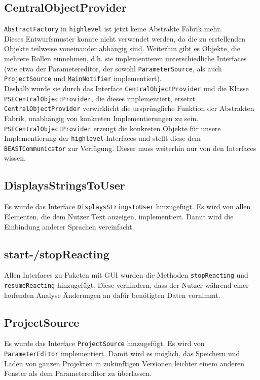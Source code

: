 \documentclass[a4paper]{scrreprt}
\begin{document}
\subsection{CentralObjectProvider}
\verb!AbstractFactory! in \verb!highlevel! ist jetzt keine Abstrakte Fabrik mehr.\\ Dieses Entwurfsmuster konnte nicht verwendet werden, da die zu erstellenden Objekte teilweise voneinander abhängig sind. Weiterhin gibt es Objekte, die mehrere Rollen einnehmen, d.h. sie implementieren unterschiedliche Interfaces (wie etwa der Parametereditor, der sowohl \verb!ParameterSource!, als auch \verb!ProjectSource! und \verb!MainNotifier! implementiert). \\
Deshalb wurde sie durch das Interface \verb!CentralObjectProvider! und die Klasse\\ \verb!PSECentralObjectProvider!, die dieses implementiert, ersetzt. \verb!CentralObjectProvider! verwirklicht die ursprüngliche Funktion der Abstrakten Fabrik, unabhängig von konkreten Implementierungen zu sein. \\
\verb!PSECentralObjectProvider! erzeugt die konkreten Objekte für unsere Implementierung der \verb!highlevel!-Interfaces und stellt diese dem \verb!BEASTCommunicator! zur Verfügung. Dieser muss weiterhin nur von den Interfaces wissen. \\

\subsection{DisplaysStringsToUser}
Es wurde das Interface \verb!DisplaysStringsToUser! hinzugefügt. Es wird von allen Elementen, die dem Nutzer Text anzeigen, implementiert. Damit wird die Einbindung anderer Sprachen vereinfacht. \\

\subsection{start-/stopReacting}
Allen Interfaces zu Paketen mit GUI wurden die Methoden \verb!stopReacting! und \\ \verb!resumeReacting! hinzugefügt. Diese verhindern, dass der Nutzer während einer laufenden Analyse Änderungen an dafür benötigten Daten vornimmt. \\

\subsection{ProjectSource}
Es wurde das Interface \verb!ProjectSource! hinzugefügt. Es wird von \verb!ParameterEditor! implementiert. Damit wird es möglich, das Speichern und Laden von ganzen Projekten in zukünftigen Versionen leichter einem anderen Fenster als dem Parametereditor zu überlassen. \\
\end{document}
